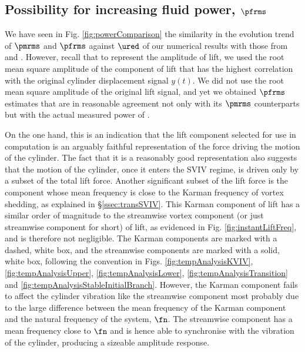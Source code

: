 \documentclass[a4paper,fleqn]{cas-sc}
\begin{document}
\subsection{Possibility for increasing fluid power, $\pfrms$} \label{ssec:possIncrease}
We have seen in Fig. \ref{fig:powerComparison} the similarity in the evolution trend of  $\pmrms$ and $\pfrms$ against $\ured$ of our numerical results with those from \citet{Nguyen2012} and \citet{Koide2013}. However, recall that to represent the amplitude of lift, we used the root mean square amplitude of the component of lift that has the highest correlation with the original cylinder displacement signal $y \left( t \right)$. We did not use the root mean square amplitude of the original lift signal, and yet we obtained $\pfrms$ estimates that are in reasonable agreement not only with its $\pmrms$ counterparts but with the actual measured power of \citet{Koide2013}.

On the one hand, this is an indication that the lift component selected for use in computation is an arguably faithful representation of the force driving the motion of the cylinder. The fact that it is a reasonably good representation also suggests that the motion of the cylinder, once it enters the SVIV regime, is driven only by a subset of the total lift force. Another significant subset of the lift force is the component whose mean frequency is close to the Karman frequency of vortex shedding, as explained in \S\ref{ssec:transSVIV}. This Karman component of lift has a similar order of magnitude to the streamwise vortex component (or just streamwise component for short) of lift, as evidenced in Fig. \ref{fig:instantLiftFreq}, and is therefore not negligible. The Karman components are marked with a dashed, white box, and the streamwise components are marked with a solid, white box, following the convention in Figs. \ref{fig:tempAnalysisKVIV}, \ref{fig:tempAnalysisUpper}, \ref{fig:tempAnalysisLower}, \ref{fig:tempAnalysisTransition} and \ref{fig:tempAnalysisStableInitialBranch}. However, the Karman component fails to affect the cylinder vibration like the streamwise component most probably due to the large difference between the mean frequency of the Karman component and the natural frequency of the system, $\fn$.  The streamwise component has a mean frequency close to $\fn$ and is hence able to synchronise with the vibration of the cylinder, producing a sizeable amplitude response.
\end{document}

